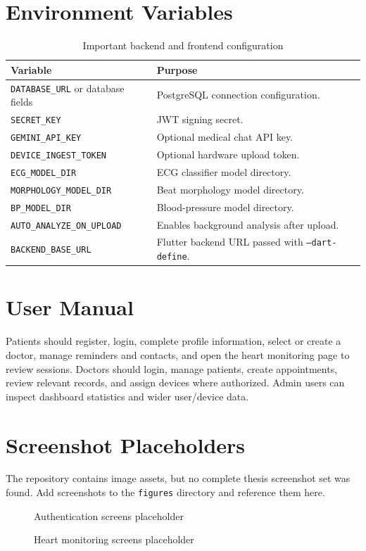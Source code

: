 \section{Environment Variables}

\begin{table}[H]
\centering
\caption{Important backend and frontend configuration}
\begin{tabular}{p{} p{}}
\toprule
\textbf{Variable} & \textbf{Purpose}\\
\midrule
\texttt{DATABASE\_URL} or database fields & PostgreSQL connection configuration.\\
\texttt{SECRET\_KEY} & JWT signing secret.\\
\texttt{GEMINI\_API\_KEY} & Optional medical chat API key.\\
\texttt{DEVICE\_INGEST\_TOKEN} & Optional hardware upload token.\\
\texttt{ECG\_MODEL\_DIR} & ECG classifier model directory.\\
\texttt{MORPHOLOGY\_MODEL\_DIR} & Beat morphology model directory.\\
\texttt{BP\_MODEL\_DIR} & Blood-pressure model directory.\\
\texttt{AUTO\_ANALYZE\_ON\_UPLOAD} & Enables background analysis after upload.\\
\texttt{BACKEND\_BASE\_URL} & Flutter backend URL passed with \texttt{--dart-define}.\\
\bottomrule
\end{tabular}
\end{table}

\section{User Manual}

Patients should register, login, complete profile information, select or create a doctor, manage reminders and contacts, and open the heart monitoring page to review sessions. Doctors should login, manage patients, create appointments, review relevant records, and assign devices where authorized. Admin users can inspect dashboard statistics and wider user/device data.

\section{Screenshot Placeholders}

The repository contains image assets, but no complete thesis screenshot set was found. Add screenshots to the \texttt{figures} directory and reference them here.

\begin{figure}[H]
\centering
{}
\caption{Authentication screens placeholder}
\end{figure}

\begin{figure}[H]
\centering
{}
\caption{Heart monitoring screens placeholder}
\end{figure}
